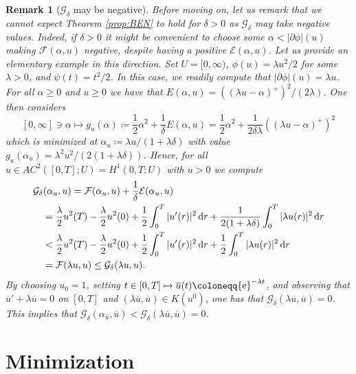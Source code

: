 \documentclass[reqno]{amsart}
\newcommand{\dr}{{\rm d} r}
\newcommand{\ove}{\overline}
\renewcommand{\sl}{|\partial \phi|}
\newcommand{\GG}{{\mathcal G}}
\newcommand{\EE}{{\mathcal E}}
\newcommand{\FF}{{\mathcal F}}
\newtheorem{remark}[theorem]{Remark}
\begin{document}
\begin{remark}[$\GG_\delta$ may be negative]
  Before moving on, let us remark that we cannot expect  Theorem
   \ref{prop:BEN} to hold for $\delta>0$ as $\GG_\delta$ may take
  negative values. Indeed, if $\delta >0$ it might be convenient to
  choose some $\alpha<\sl(u)$ making $\FF(\alpha,u)$ negative, despite
   having  a positive $\EE(\alpha,u)$. Let us provide an
  elementary example in this direction. Set $U=[0,\infty)$,
  $\phi(u) = \lambda u^2/2$ for some $\lambda >0$, and
  $\psi(t) = t^2/2$. In this case, we readily compute that
  $\sl(u) =\lambda u$. For all $\alpha \geq 0$ and $ u \geq 0$ we 
  have  that
  $ E(\alpha, u) = ((\lambda u - \alpha)^+)^2/(2\lambda)$. One then
  considers
$$ [0,\infty] \ni \alpha  \mapsto g_{ u}( \alpha)\coloneqq\frac12 \alpha^2 +
\frac{1}{\delta} E(\alpha, u) = \frac12 \alpha^2 +
\frac{1}{2\delta\lambda }((\lambda u - \alpha)^+)^2$$ which is
minimized at $ \alpha_{ u} \coloneqq \lambda u/ (1+ \lambda \delta)$
with value
$g_{ u}( \alpha_{ u}) = \lambda^2 u^2/(2(1+\lambda \delta)) $. Hence,
for all $ u \in AC^2([0,T];U) = H^1(0,T;U)$ with $ u>0$ we compute
\begin{align*}
  & \GG_\delta( \alpha_{ u}, u) = \FF(\alpha_{
    u}, u)+\frac{1}{\delta}\EE( \alpha_{ u}, u) \\
  &\quad=
    \frac{\lambda}{2}u^2(T) -  \frac{\lambda}{2}u^2(0) +
    \frac12\int_0^T | u'(r)|^2\, \dr +
    \frac{1}{ 2(1+\lambda\delta)}\int_0^T |\lambda  u(r)|^2\,
    \dr\nonumber\\
  &\quad <  \frac{\lambda}{2}u^2(T) -  \frac{\lambda}{2}u^2(0) +
    \frac12\int_0^T | u'(r)|^2\, \dr +
    \frac{1}{2}\int_0^T |\lambda  u(r)|^2\,
    \dr \nonumber\\
  &\quad =\FF(\lambda  u, u)\leq \GG_\delta (\lambda 
    u, u).
\end{align*}
By choosing $u_0=1$, setting
$t\in [0,T]\mapsto \ove u(t) \coloneqq {\rm e}^{-\lambda t}$, and
observing that $\ove u '+\lambda \ove u=0$  on $[0,T]$  and
$(\lambda \ove u ,\ove u)\in K(u^0)$, one has that
$\GG_\delta(\lambda \ove u ,\ove u)=0$. This implies that
$\GG_\delta(\alpha_{\ove u}, \ove u)<\GG_\delta(\lambda \ove u ,\ove
u)=0$.
\end{remark}


\section{Minimization} \label{sec:minimization}
 
\end{document}
